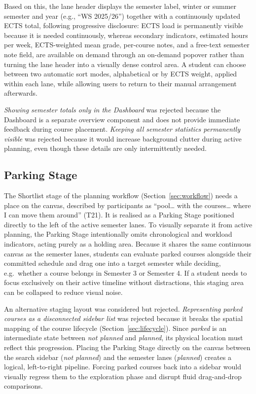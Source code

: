 Based on this, the lane header displays the semester label, winter or summer semester and year (e.g., \enquote{WS 2025/26}) together with a continuously updated ECTS total, following progressive disclosure: ECTS load is permanently visible because it is needed continuously, whereas secondary indicators, estimated hours per week, ECTS-weighted mean grade, per-course notes, and a free-text semester note field, are available on demand through an on-demand popover rather than turning the lane header into a visually dense control area. A student can choose between two automatic sort modes, alphabetical or by ECTS weight, applied within each lane, while allowing users to return to their manual arrangement afterwards.

\emph{Showing semester totals only in the Dashboard} was rejected because the Dashboard is a separate overview component and does not provide immediate feedback during course placement. \emph{Keeping all semester statistics permanently visible} was rejected because it would increase background clutter during active planning, even though these details are only intermittently needed.

\subsection{Parking Stage}
\label{sec:parking}
The Shortlist stage of the planning workflow (Section~\ref{sec:workflow}) needs a place on the canvas, described by participants as \enquote{pool… with the courses… where I can move them around} (T21). It is realised as a Parking Stage positioned directly to the left of the active semester lanes. To visually separate it from active planning, the Parking Stage intentionally omits chronological and workload indicators, acting purely as a holding area. Because it shares the same continuous canvas as the semester lanes, students can evaluate parked courses alongside their committed schedule and drag one into a target semester while deciding, e.g.\ whether a course belongs in Semester 3 or Semester 4. If a student needs to focus exclusively on their active timeline without distractions, this staging area can be collapsed to reduce visual noise.

An alternative staging layout was considered but rejected. \emph{Representing parked courses as a disconnected sidebar list} was rejected because it breaks the spatial mapping of the course lifecycle (Section~\ref{sec:lifecycle}). Since \emph{parked} is an intermediate state between \emph{not planned} and \emph{planned}, its physical location must reflect this progression. Placing the Parking Stage directly on the canvas between the search sidebar (\emph{not planned}) and the semester lanes (\emph{planned}) creates a logical, left-to-right pipeline. Forcing parked courses back into a sidebar would visually regress them to the exploration phase and disrupt fluid drag-and-drop comparisons.

